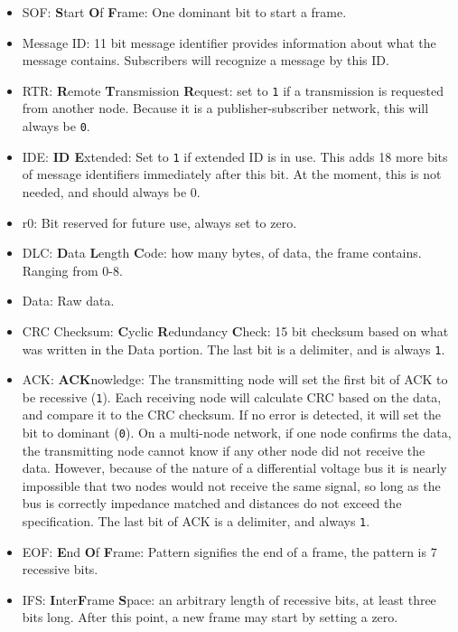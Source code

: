 \begin{itemize}
	\item SOF: \textbf{S}tart \textbf{O}f \textbf{F}rame: One dominant bit to start a frame.
	\item Message ID: 11 bit message identifier provides information about what the message contains. Subscribers will recognize a message by this ID.
	\item RTR: \textbf{R}emote \textbf{T}ransmission \textbf{R}equest: set to \texttt{1} if a transmission is requested from another node. Because it is a publisher-subscriber network, this will always be \texttt{0}.
	\item IDE: \textbf{ID E}xtended: Set to \texttt{1} if extended ID is in use. This adds 18 more bits of message identifiers immediately after this bit. At the moment, this is not needed, and should always be 0.
	\item r0: Bit reserved for future use, always set to zero.
	\item DLC: \textbf{D}ata \textbf{L}ength \textbf{C}ode: how many bytes, of data, the frame contains. Ranging from 0-8.
	\item Data: Raw data. 
	\item CRC Checksum: \textbf{C}yclic \textbf{R}edundancy \textbf{C}heck: 15 bit checksum based on what was written in the Data portion. The last bit is a delimiter, and is always \texttt{1}.
	\item ACK: \textbf{ACK}nowledge: The transmitting node will set the first bit of ACK to be recessive (\texttt{1}). Each receiving node will calculate CRC based on the data, and compare it to the CRC checksum. If no error is detected, it will set the bit to dominant (\texttt{0}). On a multi-node network, if one node confirms the data, the transmitting node cannot know if any other node did not receive the data. However, because of the nature of a differential voltage bus it is nearly impossible that two nodes would not receive the same signal, so long as the bus is correctly impedance matched and distances do not exceed the specification. The last bit of ACK is a delimiter, and always \texttt{1}.
	\item EOF: \textbf{E}nd \textbf{O}f \textbf{F}rame: Pattern signifies the end of a frame, the pattern is 7 recessive bits.
	\item IFS: \textbf{I}nter\textbf{F}rame \textbf{S}pace: an arbitrary length of recessive bits, at least three bits long. After this point, a new frame may start by setting a zero.
\end{itemize}

